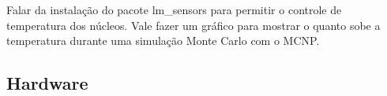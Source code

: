 \documentclass[twoside,a4paper,12pt,english]{inac19}
\begin{document}
Falar da instalação do pacote lm\_sensors para permitir o controle de temperatura dos núcleos. Vale fazer um gráfico para mostrar o quanto sobe 
a temperatura durante uma simulação Monte Carlo com o MCNP.





\subsection{Hardware}
\end{document}

